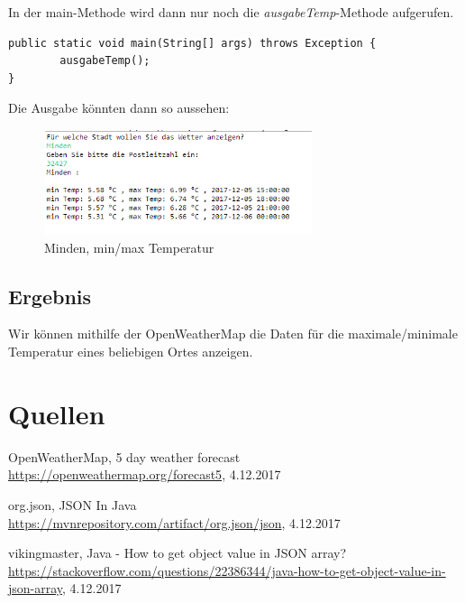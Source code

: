 In der main-Methode wird dann nur noch die \textit{ausgabeTemp}-Methode aufgerufen.

\begin{lstlisting}[caption={main}]
public static void main(String[] args) throws Exception {
		ausgabeTemp();
}
\end{lstlisting}

Die Ausgabe könnten dann so aussehen: 

\begin{figure}[htbp]
\begin{center}
\includegraphics[width=0.7\textwidth]{Bild2}
\caption{Minden, min/max Temperatur}
\end{center}
\end{figure}

\subsection{Ergebnis}

Wir können mithilfe der OpenWeatherMap die Daten für die maximale/minimale Temperatur eines beliebigen Ortes anzeigen.

\section{Quellen}
\begin{thebibliography}{999}
 OpenWeatherMap, 5 day weather forecast \\ \url{https://openweathermap.org/forecast5}, 4.12.2017

 org.json, JSON In Java \\ \url{https://mvnrepository.com/artifact/org.json/json}, 4.12.2017

 vikingmaster, Java - How to get object value in JSON array? \\ \url{https://stackoverflow.com/questions/22386344/java-how-to-get-object-value-in-json-array}, 4.12.2017
\end{thebibliography}







